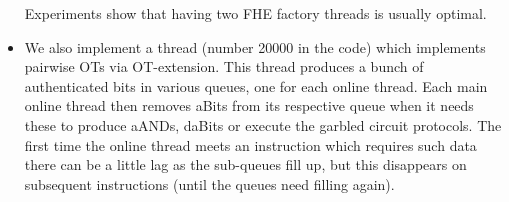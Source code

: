 \begin{itemize}
Experiments show that having two FHE factory threads is usually
optimal.
\item We also implement a thread (number 20000 in the code)
which implements pairwise OTs via OT-extension.
This thread produces a bunch of authenticated bits in various
queues, one for each online thread.
Each main online thread then removes aBits from its respective
queue when it needs these to produce aANDs, daBits or execute
the garbled circuit protocols.
The first time the online thread meets an instruction which
requires such data there can be a little lag as the sub-queues
fill up, but this disappears on subsequent instructions
(until the queues need filling again).
\end{itemize}



